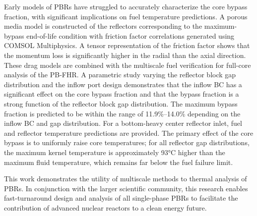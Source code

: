 \documentclass{ucbthesis}
\begin{document}
Early models of PBRs have struggled to accurately characterize the core bypass fraction, with significant implications on fuel temperature predictions. A porous media model is constructed of the reflectors corresponding to the maximum-bypass end-of-life condition with friction factor correlations generated using COMSOL Multiphysics. A tensor representation of the friction factor shows that the momentum loss is significantly higher in the radial than the axial direction. These drag models are combined with the multiscale fuel verification for full-core analysis of the PB-FHR. A parametric study varying the reflector block gap distribution and the inflow port design demonstrates that the inflow BC has a significant effect on the core bypass fraction and that the bypass fraction is a strong function of the reflector block gap distribution. The maximum bypass fraction is predicted to be within the range of 11.9\%--14.0\% depending on the inflow BC and gap distribution. For a bottom-heavy center reflector inlet, fuel and reflector temperature predictions are provided. The primary effect of the core bypass is to uniformly raise core temperatures; for all reflector gap distributions, the maximum kernel temperature is approximately 93\si{\celsius} higher than the maximum fluid temperature, which remains far below the fuel failure limit.

This work demonstrates the utility of multiscale methods to thermal analysis of PBRs. In conjunction with the larger scientific community, this research enables fast-turnaround design and analysis of all single-phase PBRs to facilitate the contribution of advanced nuclear reactors to a clean energy future. 
\end{document}
